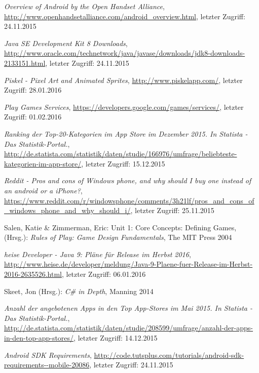 \begin{thebibliography}{}
\emph{Overview of Android by the Open Handset Alliance},
\url{http://www.openhandsetalliance.com/android_overview.html}, letzter Zugriff: 24.11.2015

\emph{Java SE Development Kit 8 Downloads},
\url{http://www.oracle.com/technetwork/java/javase/downloads/jdk8-downloads-2133151.html}, letzter Zugriff: 24.11.2015

\emph{Piskel - Pixel Art and Animated Sprites},
\url{http://www.piskelapp.com/}, letzter Zugriff: 28.01.2016

\emph{Play Games Services},
\url{https://developers.google.com/games/services/}, letzter Zugriff: 01.02.2016

\emph{Ranking der Top-20-Kategorien im App Store im Dezember 2015. In Statista - Das Statistik-Portal.},
\url{http://de.statista.com/statistik/daten/studie/166976/umfrage/beliebteste-kategorien-im-app-store/}, letzter Zugriff: 15.12.2015

\emph{Reddit - Pros and cons of Windows phone, and why should I buy one instead of an android or a iPhone?},
\url{https://www.reddit.com/r/windowsphone/comments/3h21lf/pros_and_cons_of_windows_phone_and_why_should_i/}, letzter Zugriff: 25.11.2015

Salen, Katie \& Zimmerman, Eric: 
\glqq Unit 1: Core Concepts: Defining Games\grqq, 
(Hrsg.): \emph{Rules of Play: Game Design Fundamentals}, The MIT Press 2004

\emph{heise Developer - Java 9: Pläne für Release im Herbst 2016},
\url{http://www.heise.de/developer/meldung/Java-9-Plaene-fuer-Release-im-Herbst-2016-2635526.html}, letzter Zugriff: 06.01.2016

Skeet, Jon (Hrsg.): 
\emph{C\# in Depth}, Manning 2014

\emph{Anzahl der angebotenen Apps in den Top App-Stores im Mai 2015. In Statista - Das Statistik-Portal.},
\url{http://de.statista.com/statistik/daten/studie/208599/umfrage/anzahl-der-apps-in-den-top-app-stores/}, letzter Zugriff: 14.12.2015

\emph{Android SDK Requirements},
\url{http://code.tutsplus.com/tutorials/android-sdk-requirements--mobile-20086}, letzter Zugriff: 24.11.2015


\end{thebibliography}
